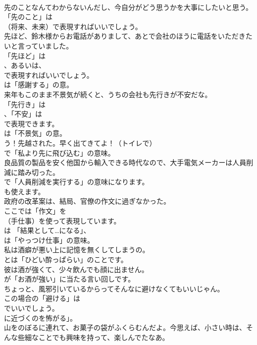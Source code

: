 \documentclass[8pt]{extreport}
\begin{document}
\begin{CJK}{UTF8}{min}
\\	先のことなんてわからないんだし、今自分がどう思うかを大事にしたいと思う。 
\\	「先のこと」は 
\\	（将来、未来）で表現すればいいでしょう。	
\\	先ほど、鈴木様からお電話がありまして、あとで会社のほうに電話をいただきたいと言っていました。 
\\	「先ほど」は 
\\	、あるいは、
\\	で表現すればいいでしょう。
\\	は「感謝する」の意。	
\\	来年もこのまま不景気が続くと、うちの会社も先行きが不安だな。 
\\	「先行き」は
\\	、「不安」は
\\	で表現できます。
\\	は「不景気」の意。	
\\	う！先越された。早く出てきてよ！（トイレで） 
\\	で「私より先に飛び込む」の意味。	
\\	良品質の製品を安く他国から輸入できる時代なので、大手電気メーカーは人員削減に踏み切った。 
\\	で「人員削減を実行する」の意味になります。
\\	も使えます。	
\\	政府の改革案は、結局、官僚の作文に過ぎなかった。 
\\	ここでは「作文」を 
\\	（手仕事）を使って表現しています。
\\	は 「結果として…になる」、
\\	は「やっつけ仕事」の意味。	
\\	私は酒癖が悪い上に記憶を無くしてしまうの。 
\\	とは「ひどい酔っぱらい」のことです。	
\\	彼は酒が強くて、少々飲んでも顔に出ません。 
\\	が「お酒が強い」に当たる言い回しです。	
\\	ちょっと、風邪引いているからってそんなに避けなくてもいいじゃん。 
\\	この場合の「避ける」は
\\	でいいでしょう。
\\	に近づくのを怖がる」。	
\\	山をのぼるに連れて、お菓子の袋がふくらむんだよ。今思えば、小さい時は、そんな些細なことでも興味を持って、楽しんでたなあ。 

\end{CJK}
\end{document}
